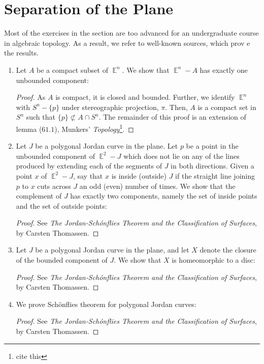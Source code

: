 \documentclass{book}
\DeclareMathOperator*{\E}{\mathbb{E}}
\begin{document}
\section{Separation of the Plane}
Most of the exercises in the section are too advanced for an undergraduate course in algebraic topology. As a result, we refer to well-known sources, which prov e the results. 
\begin{enumerate}[(1)]
    \item Let $A$ be a compact subset of $\E^n$. We show that $\E^n - A$ has exactly one unbounded component: 
        \begin{proof} As $A$ is compact, it is closed and bounded. Further, we identify $\E^n$ with $S^n - \{p\}$ under stereographic projection, $\pi$. Then, $A$ is a compact set in $S^n$ such that $\{p\} \not\subset A \cap S^n$. The  remainder of this proof is an extension of lemma ($61.1$), Munkers' \textit{Topology}\footnote{cite this}. 
        \end{proof}

    \item Let $J$ be a polygonal Jordan curve in the plane. Let $p$ be a point in the unbounded component of $\E^2 - J$ which does not lie on any of the lines produced by extending each of the segments of $J$ in both directions. Given a point $x$ of $\E^2 - J$, say that $x$ is inside (outside) $J$ if the straight line joining $p$ to $x$ cuts across $J$ an odd (even) number of times. We show that the complement of $J$ has exactly two components, namely the set of inside points and the set of outside points: 
        \begin{proof} See \textit{The Jordan-Sch\'onflies Theorem and the Classification of Surfaces}, by Carsten Thomassen. 
        \end{proof}

    \item Let $J$ be a polygonal Jordan curve in the plane, and let $X$ denote the closure of the bounded component of $J$. We show that $X$ is homeomorphic to a disc: 
        \begin{proof} See \textit{The Jordan-Sch\'onflies Theorem and the Classification of Surfaces}, by Carsten Thomassen. 
        \end{proof}

    \item We prove Sch\"onflies theorem for polygonal Jordan curves: 
        \begin{proof} See \textit{The Jordan-Sch\'onflies Theorem and the Classification of Surfaces}, by Carsten Thomassen. 
        \end{proof}


\end{enumerate}
\end{document}
